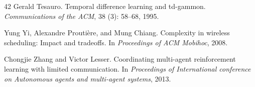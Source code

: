 \documentclass{article} %
\begin{document}
\begin{thebibliography}{42}
Gerald Tesauro.
\newblock Temporal difference learning and td-gammon.
\newblock \emph{Communications of the ACM}, 38 (3): 58--68,
  1995.

Yung Yi, Alexandre Prouti\`{e}re, and Mung Chiang.
\newblock Complexity in wireless scheduling: Impact and tradeoffs.
\newblock In \emph{Proceedings of ACM Mobihoc}, 2008.

Chongjie Zhang and Victor Lesser.
\newblock Coordinating multi-agent reinforcement learning with limited
  communication.
\newblock In \emph{Proceedings of International conference on Autonomous agents
  and multi-agent systems}, 2013.

\end{thebibliography}

\newpage

\end{document}
